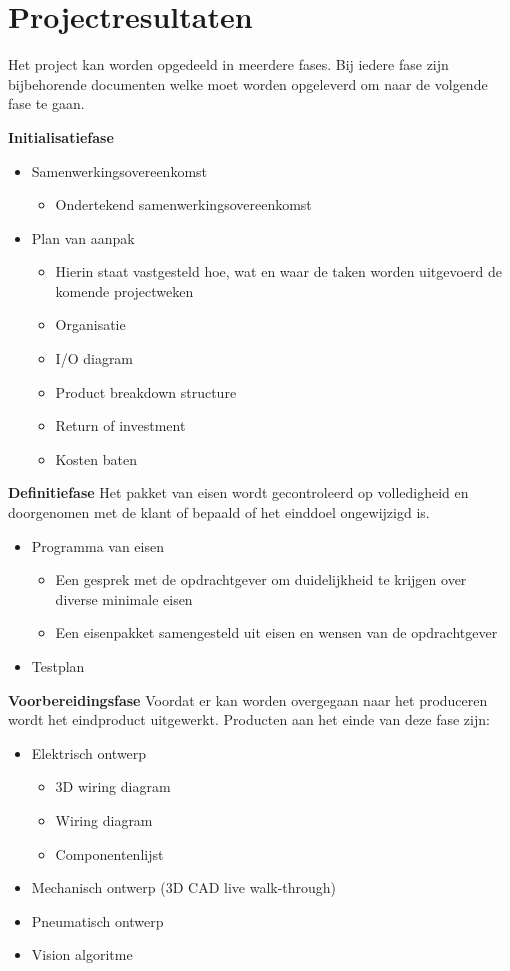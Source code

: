 
\section{Projectresultaten}
Het project kan worden opgedeeld in meerdere fases. Bij iedere fase zijn bijbehorende documenten welke moet worden opgeleverd om naar de volgende fase te gaan. 
\vspace{5mm}

\textbf{Initialisatiefase}


\begin{itemize}
	\item Samenwerkingsovereenkomst
	\begin{itemize}
		\item Ondertekend samenwerkingsovereenkomst
	\end{itemize}
	\item Plan van aanpak
	\begin{itemize}
		\item Hierin staat vastgesteld hoe, wat en waar de taken worden uitgevoerd de komende projectweken
		\item Organisatie
		\item I/O diagram
		\item Product breakdown structure
		\item Return of investment
		\item Kosten baten
	\end{itemize}
\end{itemize}


\textbf{Definitiefase}
Het pakket van eisen wordt gecontroleerd op volledigheid en doorgenomen met de klant of bepaald of het einddoel ongewijzigd is. 

\begin{itemize}
	\item Programma van eisen
	\begin{itemize}
		\item Een gesprek met de opdrachtgever om duidelijkheid te krijgen over diverse minimale eisen
		\item Een eisenpakket samengesteld uit eisen en wensen van de opdrachtgever
	\end{itemize}
	\item Testplan
\end{itemize}

\textbf{Voorbereidingsfase}
Voordat er kan worden overgegaan naar het produceren wordt het eindproduct uitgewerkt. Producten aan het einde van deze fase zijn:
\begin{itemize}
	\item Elektrisch ontwerp
	\begin{itemize}
		\item 3D wiring diagram
		\item Wiring diagram
		\item Componentenlijst
	\end{itemize}
	\item Mechanisch ontwerp (3D CAD live walk-through)
	\item Pneumatisch ontwerp
	\item Vision algoritme
\end{itemize}

